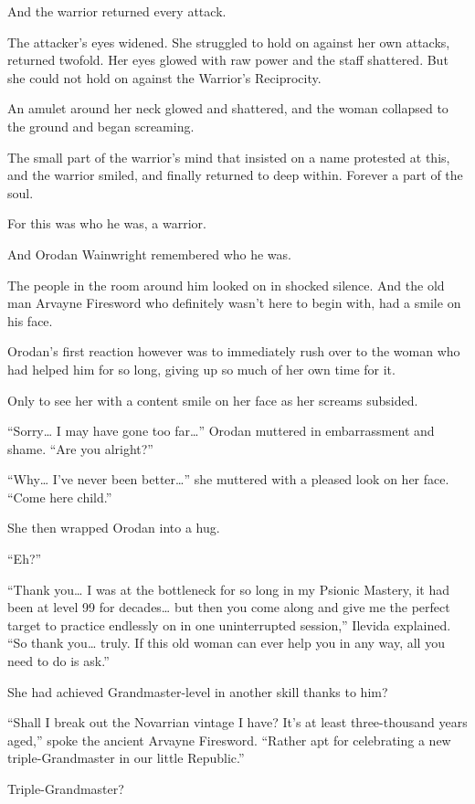\documentclass[a4paper,10pt]{book}
\begin{document}
And the warrior returned every attack.\par
The attacker’s eyes widened. She struggled to hold on against her own attacks, returned twofold. Her eyes glowed with raw power and the staff shattered. But she could not hold on against the Warrior’s Reciprocity.\par
An amulet around her neck glowed and shattered, and the woman collapsed to the ground and began screaming.\par
The small part of the warrior’s mind that insisted on a name protested at this, and the warrior smiled, and finally returned to deep within. Forever a part of the soul.\par
For this was who he was, a warrior.\par
And Orodan Wainwright remembered who he was.\par
The people in the room around him looked on in shocked silence. And the old man Arvayne Firesword who definitely wasn’t here to begin with, had a smile on his face.\par
Orodan’s first reaction however was to immediately rush over to the woman who had helped him for so long, giving up so much of her own time for it.\par
Only to see her with a content smile on her face as her screams subsided.\par
“Sorry… I may have gone too far…” Orodan muttered in embarrassment and shame. “Are you alright?”\par
“Why… I’ve never been better…” she muttered with a pleased look on her face. “Come here child.”\par
She then wrapped Orodan into a hug.\par
“Eh?”\par
“Thank you… I was at the bottleneck for so long in my Psionic Mastery, it had been at level 99 for decades… but then you come along and give me the perfect target to practice endlessly on in one uninterrupted session,” Ilevida explained. “So thank you… truly. If this old woman can ever help you in any way, all you need to do is ask.”\par
She had achieved Grandmaster-level in another skill thanks to him?\par
“Shall I break out the Novarrian vintage I have? It’s at least three-thousand years aged,” spoke the ancient Arvayne Firesword. “Rather apt for celebrating a new triple-Grandmaster in our little Republic.”\par
Triple-Grandmaster?\par
\end{document}
